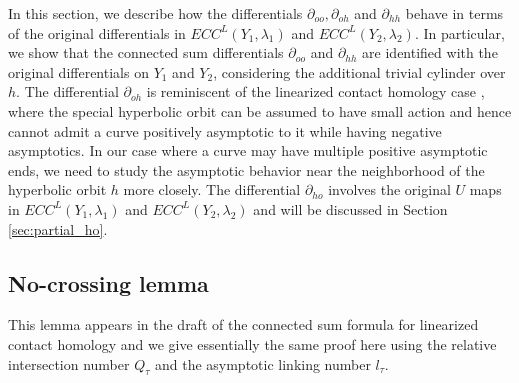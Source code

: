 \documentclass{article}
\numberwithin{equation}{section}
\theoremstyle{definition}
\begin{document}
In this section, we describe how the differentials $\partial_{oo}, \partial_{oh}$ and $\partial_{hh}$ behave in terms of the original differentials in $ECC^L(Y_1,\lambda_1)$ and $ECC^L(Y_2,\lambda_2)$. In particular, we show that the connected sum differentials $\partial_{oo}$ and $\partial_{hh}$ are identified with the original differentials on $Y_1$ and $Y_2$, considering the additional trivial cylinder over $h$. The differential $\partial_{oh}$ is reminiscent of the linearized contact homology case \cite{BVK}, where the special hyperbolic orbit can be assumed to have small action and hence cannot admit a curve positively asymptotic to it while having negative asymptotics. In our case where a curve may have multiple positive asymptotic ends, we need to study the asymptotic behavior near the neighborhood of the hyperbolic orbit $h$ more closely. The differential $\partial_{ho}$ involves the original $U$ maps in $ECC^L(Y_1,\lambda_1)$ and $ECC^L(Y_2,\lambda_2)$ and will be discussed in Section \ref{sec:partial_ho}.

\subsection{No-crossing lemma}
\label{sec:no_crossing}
This lemma appears in the draft of the connected sum formula for linearized contact homology \cite{BVK} and we give essentially the same proof here using the relative intersection number $Q_\tau$ and the asymptotic linking number $l_\tau$. 
\end{document}
